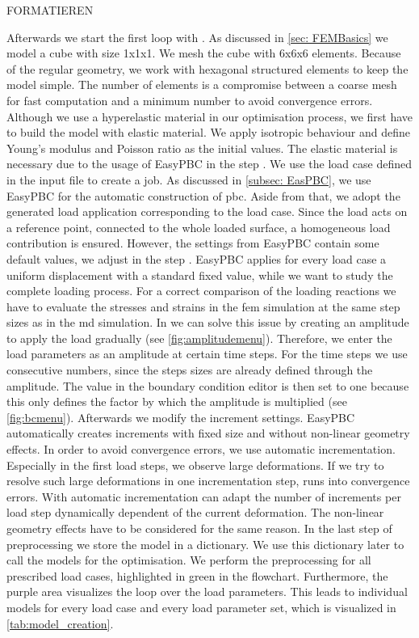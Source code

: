 FORMATIEREN


Afterwards we start the first loop with . As discussed in \autoref{sec: FEMBasics} we model a cube with size 1x1x1. We mesh the cube with 6x6x6 elements. Because of the regular geometry, we work with hexagonal structured elements to keep the model simple. The number of elements is a compromise between a coarse mesh for fast computation and a minimum number to avoid convergence errors. Although we use a hyperelastic material in our optimisation process, we first have to build the model with elastic material. We apply isotropic behaviour and define Young's modulus and Poisson ratio as the initial values. The elastic material is necessary due to the usage of EasyPBC in the step . We use the load case defined in the input file to create a job. As discussed in \autoref{subsec: EasPBC}, we use EasyPBC for the automatic construction of \acrshort{pbc}. Aside from that, we adopt the generated load application corresponding to the load case. Since the load acts on a reference point, connected to the whole loaded surface, a homogeneous load contribution is ensured.
However, the settings from EasyPBC contain some default values, we adjust in the step . EasyPBC applies for every load case a uniform displacement with a standard fixed value, while we want to study the complete loading process. For a correct comparison of the loading reactions we have to evaluate the stresses and strains in the \acrshort{fem} simulation at the same step sizes as in the \acrshort{md} simulation. In  we can solve this issue by creating an amplitude to apply the load gradually (see \autoref{fig:amplitudemenu}). Therefore, we enter the load parameters as an amplitude at certain time steps. For the time steps we use consecutive numbers, since the steps sizes are already defined through the amplitude. The value in the boundary condition editor is then set to one because this only defines the factor by which the amplitude is multiplied (see \autoref{fig:bcmenu}). Afterwards we modify the increment settings. EasyPBC automatically creates increments with fixed size and without non-linear geometry effects. In order to avoid convergence errors, we use automatic incrementation. Especially in the first load steps, we observe large deformations. If we try to resolve such large deformations in one incrementation step,  runs into convergence errors. With automatic incrementation  can adapt the number of increments per load step dynamically dependent of the current deformation. The non-linear geometry effects have to be considered for the same reason. In the last step of preprocessing we store the model in a dictionary. We use this dictionary later to call the models for the optimisation. We perform the preprocessing for all prescribed load cases, highlighted in green in the flowchart. Furthermore, the purple area visualizes the loop over the load parameters. This leads to individual models for every load case and every load parameter set, which is visualized in \autoref{tab:model_creation}.

